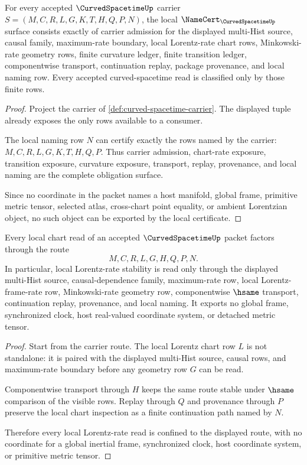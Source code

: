 \begin{theorem}
\label{thm:curved-spacetime-namecert-obligations}
For every accepted $\CurvedSpacetimeUp$ carrier $S=(M,C,R,L,G,K,T,H,Q,P,N)$, the local $\NameCert_{\CurvedSpacetimeUp}$ surface consists exactly of carrier admission for the displayed multi-Hist source, causal family, maximum-rate boundary, local Lorentz-rate chart rows, Minkowski-rate geometry rows, finite curvature ledger, finite transition ledger, componentwise transport, continuation replay, package provenance, and local naming row. Every accepted curved-spacetime read is classified only by those finite rows.
\end{theorem}
\begin{proof}
Project the carrier of \autoref{def:curved-spacetime-carrier}. The displayed tuple already exposes the only rows available to a consumer.

The local naming row $N$ can certify exactly the rows named by the carrier: $M,C,R,L,G,K,T,H,Q,P$. Thus carrier admission, chart-rate exposure, transition exposure, curvature exposure, transport, replay, provenance, and local naming are the complete obligation surface.

Since no coordinate in the packet names a host manifold, global frame, primitive metric tensor, selected atlas, cross-chart point equality, or ambient Lorentzian object, no such object can be exported by the local certificate.
\end{proof}

\begin{theorem}
\label{thm:curved-spacetime-local-lorentz-stability}
Every local chart read of an accepted $\CurvedSpacetimeUp$ packet factors through the route
$$
M,C,R,L,G,H,Q,P,N .
$$
In particular, local Lorentz-rate stability is read only through the displayed multi-Hist source, causal-dependence family, maximum-rate row, local Lorentz-frame-rate row, Minkowski-rate geometry row, componentwise $\hsame$ transport, continuation replay, provenance, and local naming. It exports no global frame, synchronized clock, host real-valued coordinate system, or detached metric tensor.
\end{theorem}
\begin{proof}
Start from the carrier route. The local Lorentz chart row $L$ is not standalone: it is paired with the displayed multi-Hist source, causal rows, and maximum-rate boundary before any geometry row $G$ can be read.

Componentwise transport through $H$ keeps the same route stable under $\hsame$ comparison of the visible rows. Replay through $Q$ and provenance through $P$ preserve the local chart inspection as a finite continuation path named by $N$.

Therefore every local Lorentz-rate read is confined to the displayed route, with no coordinate for a global inertial frame, synchronized clock, host coordinate system, or primitive metric tensor.
\end{proof}

